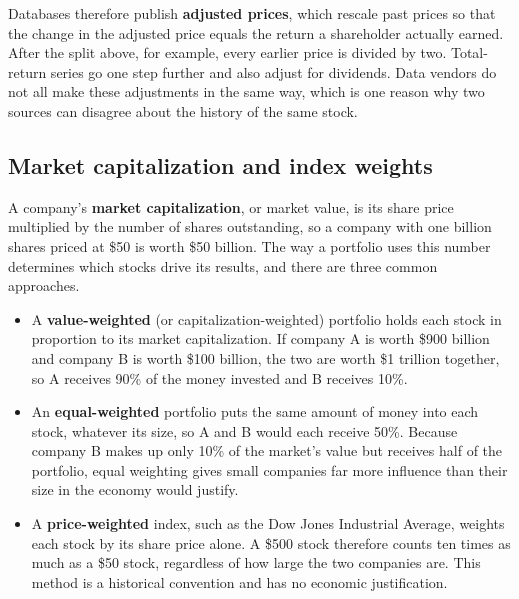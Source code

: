 Databases therefore publish \textbf{adjusted prices}, which rescale past prices so that the change in the adjusted price equals the return a shareholder actually earned. After the split above, for example, every earlier price is divided by two. Total-return series go one step further and also adjust for dividends. Data vendors do not all make these adjustments in the same way, which is one reason why two sources can disagree about the history of the same stock.

\subsection{Market capitalization and index weights}

A company's \textbf{market capitalization}, or market value, is its share price multiplied by the number of shares outstanding, so a company with one billion shares priced at \$50 is worth \$50 billion. The way a portfolio uses this number determines which stocks drive its results, and there are three common approaches.

\begin{itemize}
  \item A \textbf{value-weighted} (or capitalization-weighted) portfolio holds each stock in proportion to its market capitalization. If company A is worth \$900 billion and company B is worth \$100 billion, the two are worth \$1 trillion together, so A receives 90\% of the money invested and B receives 10\%.
  \item An \textbf{equal-weighted} portfolio puts the same amount of money into each stock, whatever its size, so A and B would each receive 50\%. Because company B makes up only 10\% of the market's value but receives half of the portfolio, equal weighting gives small companies far more influence than their size in the economy would justify.
  \item A \textbf{price-weighted} index, such as the Dow Jones Industrial Average, weights each stock by its share price alone. A \$500 stock therefore counts ten times as much as a \$50 stock, regardless of how large the two companies are. This method is a historical convention and has no economic justification.
\end{itemize}

